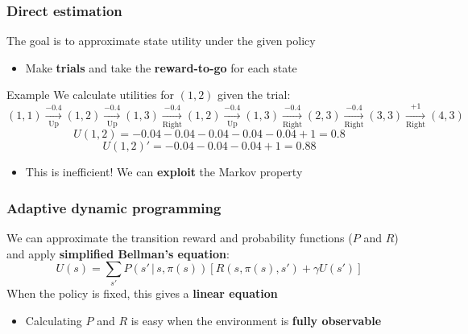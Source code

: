 \documentclass{beamer}
\begin{document}
\begin{frame}
	\frametitle{Direct estimation}
	The goal is to approximate state utility under the given policy
	\begin{itemize}
		\item Make \textbf{trials} and take the \textbf{reward-to-go} for each state
	\end{itemize}
	\pause
	\begin{block}{Example}
	We calculate utilities for $(1,2)$ given the trial:
		$$
		\scriptstyle
		(1,1) \xrightarrow[\text{Up}]{-0.4} 
		(1,2) \xrightarrow[\text{Up}]{-0.4}
		(1,3) \xrightarrow[\text{Right}]{-0.4}
		(1,2) \xrightarrow[\text{Up}]{-0.4}
		(1,3) \xrightarrow[\text{Right}]{-0.4}
		(2,3) \xrightarrow[\text{Right}]{-0.4}
		(3,3) \xrightarrow[\text{Right}]{+1}
		(4,3)
	$$
	\pause
	$$
		U(1,2) = -0.04 -0.04 -0.04 -0.04 -0.04 + 1 = 0.8
	$$
	\pause
	$$
		U(1,2)' = -0.04 -0.04 -0.04 + 1 = 0.88
	$$
	\end{block}
	\pause
	\begin{itemize}
		\item This is inefficient! We can \textbf{exploit} the Markov property 
	\end{itemize}
\end{frame}

\begin{frame}
	\frametitle{Adaptive dynamic programming}
	We can approximate the transition reward and probability functions ($P$ and $R$) and apply \textbf{simplified Bellman's equation}:
	$$
		U(s) = \sum_{s'} P(s' \, | \, s, \pi(s)) \left[ R(s, \pi(s), s') + \gamma U(s') \right]
	$$
	When the policy is fixed, this gives a \textbf{linear equation}
	\pause
	\begin{itemize}
		\item Calculating $P$ and $R$ is easy when the environment is \textbf{fully observable} 
	\end{itemize}
\end{frame}
\end{document}
